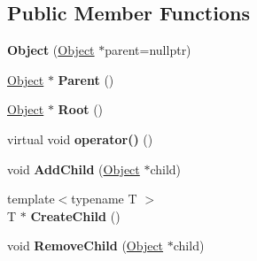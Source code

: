 \subsection*{Public Member Functions}
\begin{DoxyCompactItemize}
\item 
\hypertarget{class_aspen_1_1_object_1_1_object_abba0c3ac64269eb95646b1a07cd3ffae}{{\bfseries Object} (\hyperlink{class_aspen_1_1_object_1_1_object}{Object} $\ast$parent=nullptr)}\label{class_aspen_1_1_object_1_1_object_abba0c3ac64269eb95646b1a07cd3ffae}

\item 
\hypertarget{class_aspen_1_1_object_1_1_object_a8f224e3d221280d5031c7ddf8010eaa0}{\hyperlink{class_aspen_1_1_object_1_1_object}{Object} $\ast$ {\bfseries Parent} ()}\label{class_aspen_1_1_object_1_1_object_a8f224e3d221280d5031c7ddf8010eaa0}

\item 
\hypertarget{class_aspen_1_1_object_1_1_object_a15247881a7c8816de3bdc9099e8cbe65}{\hyperlink{class_aspen_1_1_object_1_1_object}{Object} $\ast$ {\bfseries Root} ()}\label{class_aspen_1_1_object_1_1_object_a15247881a7c8816de3bdc9099e8cbe65}

\item 
\hypertarget{class_aspen_1_1_object_1_1_object_ae827d63a640435d6cf84ef81cd9d1547}{virtual void {\bfseries operator()} ()}\label{class_aspen_1_1_object_1_1_object_ae827d63a640435d6cf84ef81cd9d1547}

\item 
\hypertarget{class_aspen_1_1_object_1_1_object_a512d17c7915076e4e15ca73cfbd67971}{void {\bfseries Add\-Child} (\hyperlink{class_aspen_1_1_object_1_1_object}{Object} $\ast$child)}\label{class_aspen_1_1_object_1_1_object_a512d17c7915076e4e15ca73cfbd67971}

\item 
\hypertarget{class_aspen_1_1_object_1_1_object_ab24f1c4ca5364dc22f4be183c945f437}{{\footnotesize template$<$typename T $>$ }\\T $\ast$ {\bfseries Create\-Child} ()}\label{class_aspen_1_1_object_1_1_object_ab24f1c4ca5364dc22f4be183c945f437}

\item 
\hypertarget{class_aspen_1_1_object_1_1_object_a31d1f3ee496a6247a73d24aac9120c61}{void {\bfseries Remove\-Child} (\hyperlink{class_aspen_1_1_object_1_1_object}{Object} $\ast$child)}\label{class_aspen_1_1_object_1_1_object_a31d1f3ee496a6247a73d24aac9120c61}


\end{DoxyCompactItemize}
